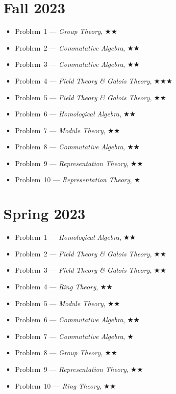 \documentclass[11pt,letterpaper]{book}
\begin{document}
\section*{Fall 2023}
\begin{itemize}
\item Problem~1 --- \textit{Group Theory}, $\bigstar\bigstar$
\item Problem~2 --- \textit{Commutative Algebra}, $\bigstar\bigstar$
\item Problem~3 --- \textit{Commutative Algebra}, $\bigstar\bigstar$
\item Problem~4 --- \textit{Field Theory \& Galois Theory}, $\bigstar\bigstar\bigstar$
\item Problem~5 --- \textit{Field Theory \& Galois Theory}, $\bigstar\bigstar$
\item Problem~6 --- \textit{Homological Algebra}, $\bigstar\bigstar$
\item Problem~7 --- \textit{Module Theory}, $\bigstar\bigstar$
\item Problem~8 --- \textit{Commutative Algebra}, $\bigstar\bigstar$
\item Problem~9 --- \textit{Representation Theory}, $\bigstar\bigstar$
\item Problem~10 --- \textit{Representation Theory}, $\bigstar$
\end{itemize}

\section*{Spring 2023}
\begin{itemize}
\item Problem~1 --- \textit{Homological Algebra}, $\bigstar\bigstar$
\item Problem~2 --- \textit{Field Theory \& Galois Theory}, $\bigstar\bigstar$
\item Problem~3 --- \textit{Field Theory \& Galois Theory}, $\bigstar\bigstar$
\item Problem~4 --- \textit{Ring Theory}, $\bigstar\bigstar$
\item Problem~5 --- \textit{Module Theory}, $\bigstar\bigstar$
\item Problem~6 --- \textit{Commutative Algebra}, $\bigstar\bigstar$
\item Problem~7 --- \textit{Commutative Algebra}, $\bigstar$
\item Problem~8 --- \textit{Group Theory}, $\bigstar\bigstar$
\item Problem~9 --- \textit{Representation Theory}, $\bigstar\bigstar$
\item Problem~10 --- \textit{Ring Theory}, $\bigstar\bigstar$
\end{itemize}
\end{document}
